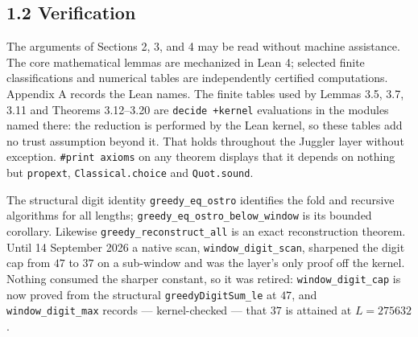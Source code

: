 \documentclass[12pt]{article}
\begin{document}
\subsection{1.2 Verification}\label{verification}

The arguments of Sections 2, 3, and 4 may be read without machine
assistance. The core mathematical lemmas are mechanized in Lean 4;
selected finite classifications and numerical tables are independently
certified computations. Appendix A records the Lean names. The finite
tables used by Lemmas 3.5, 3.7, 3.11 and Theorems 3.12--3.20 are
\texttt{decide\ +kernel} evaluations in the modules named there: the
reduction is performed by the Lean kernel, so these tables add no trust
assumption beyond it. That holds throughout the Juggler layer without
exception. \texttt{\#print\ axioms} on any theorem displays that it
depends on nothing but \texttt{\nolinkurl{propext}},
\texttt{\nolinkurl{Classical.choice}} and
\texttt{\nolinkurl{Quot.sound}}.

The structural digit identity \texttt{\nolinkurl{greedy_eq_ostro}}
identifies the fold and recursive algorithms for all lengths;
\texttt{\nolinkurl{greedy_eq_ostro_below_window}} is its bounded
corollary. Likewise \texttt{\nolinkurl{greedy_reconstruct_all}} is an
exact reconstruction theorem. Until 14 September 2026 a native scan,
\texttt{\nolinkurl{window_digit_scan}}, sharpened the digit cap from
\(47\) to \(37\) on a sub-window and was the layer's only proof off the
kernel. Nothing consumed the sharper constant, so it was retired:
\texttt{\nolinkurl{window_digit_cap}} is now proved from the structural
\texttt{\nolinkurl{greedyDigitSum_le}} at \(47\), and
\texttt{\nolinkurl{window_digit_max}} records --- kernel-checked ---
that \(37\) is attained at \(L = 275632\).
\end{document}
